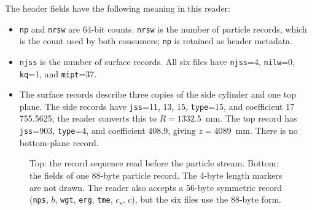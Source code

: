 \documentclass[11pt,a4paper]{article}
\begin{document}
The header fields have the following meaning in this reader:
\begin{itemize}
  \item \texttt{np} and \texttt{nrsw} are 64-bit counts.  \texttt{nrsw} is the
        number of particle records, which is the count used by both consumers;
        \texttt{np} is retained as header metadata.
  \item \texttt{njss} is the number of surface records.  All six files have
        \texttt{njss}=4, \texttt{nilw}=0, \texttt{kq}=1, and \texttt{mipt}=37.
  \item The surface records describe three copies of the side cylinder and one
        top plane.  The side records have \texttt{jss}=11, 13, 15,
        \texttt{type}=15, and coefficient 17\,755.5625; the reader converts this
        to $R=1332.5$~mm.  The top record has \texttt{jss}=903,
        \texttt{type}=4, and coefficient 408.9, giving $z=4089$~mm.  There is no
        bottom-plane record.
\end{itemize}

\begin{figure}[t]
\centering
{}
\caption{Top: the record sequence read before the particle stream.  Bottom: the
fields of one 88-byte particle record.  The 4-byte length markers are not drawn.
The reader also accepts a 56-byte symmetric record
(\texttt{nps}, $b$, \texttt{wgt}, \texttt{erg}, \texttt{tme}, $c_s$, $c$), but
the six files use the 88-byte form.}
\label{fig:format}
\end{figure}
\end{document}
